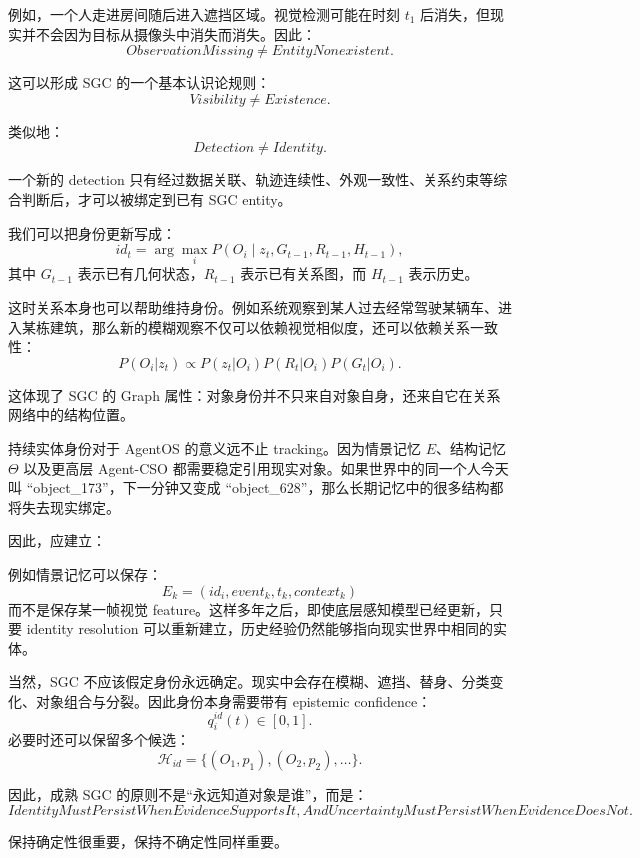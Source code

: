 例如，一个人走进房间随后进入遮挡区域。视觉检测可能在时刻 \(t_1\) 后消失，但现实并不会因为目标从摄像头中消失而消失。因此：
\[
ObservationMissing
\neq
EntityNonexistent.
\]

这可以形成 SGC 的一个基本认识论规则：
\[
\boxed{
Visibility
\neq
Existence.
}
\]

类似地：
\[
Detection
\neq
Identity.
\]

一个新的 detection 只有经过数据关联、轨迹连续性、外观一致性、关系约束等综合判断后，才可以被绑定到已有 SGC entity。

我们可以把身份更新写成：
\[
id_t
=
\arg\max_i
P
\left(
O_i
\mid
z_t,
G_{t-1},
R_{t-1},
H_{t-1}
\right),
\]
其中 \(G_{t-1}\) 表示已有几何状态，\(R_{t-1}\) 表示已有关系图，而 \(H_{t-1}\) 表示历史。

这时关系本身也可以帮助维持身份。例如系统观察到某人过去经常驾驶某辆车、进入某栋建筑，那么新的模糊观察不仅可以依赖视觉相似度，还可以依赖关系一致性：
\[
P(O_i|z_t)
\propto
P(z_t|O_i)
P(R_t|O_i)
P(G_t|O_i).
\]

这体现了 SGC 的 Graph 属性：对象身份并不只来自对象自身，还来自它在关系网络中的结构位置。

持续实体身份对于 AgentOS 的意义远不止 tracking。因为情景记忆 \(E\)、结构记忆 \(\Theta\) 以及更高层 Agent-CSO 都需要稳定引用现实对象。如果世界中的同一个人今天叫 ``object\_173''，下一分钟又变成 ``object\_628''，那么长期记忆中的很多结构都将失去现实绑定。

因此，应建立：
\begin{statementbox}
\centering
{}
\end{statementbox}

例如情景记忆可以保存：
\[
E_k
=
\left(
id_i,
event_k,
t_k,
context_k
\right)
\]
而不是保存某一帧视觉 feature。这样多年之后，即使底层感知模型已经更新，只要 identity resolution 可以重新建立，历史经验仍然能够指向现实世界中相同的实体。

当然，SGC 不应该假定身份永远确定。现实中会存在模糊、遮挡、替身、分类变化、对象组合与分裂。因此身份本身需要带有 epistemic confidence：
\[
q_i^{id}(t)\in[0,1].
\]
必要时还可以保留多个候选：
\[
\mathcal{H}_{id}
=
\{
(O_1,p_1),
(O_2,p_2),
\ldots
\}.
\]

因此，成熟 SGC 的原则不是“永远知道对象是谁”，而是：
\[
\boxed{
IdentityMustPersistWhenEvidenceSupportsIt,
AndUncertaintyMustPersistWhenEvidenceDoesNot.
}
\]

保持确定性很重要，保持不确定性同样重要。

